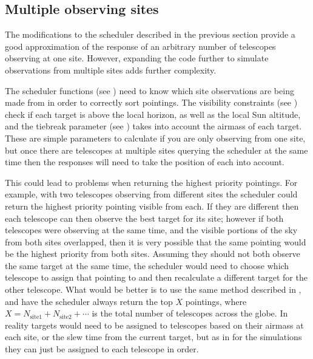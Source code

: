 \subsection{Multiple observing sites}
\label{sec:multi_site_scheduling}
\begin{colsection}

The modifications to the scheduler described in the previous section provide a good approximation of the response of an arbitrary number of telescopes observing at one site. However, expanding the code further to simulate observations from multiple sites adds further complexity.

The scheduler functions (see ) need to know which site observations are being made from in order to correctly sort pointings. The visibility constraints (see ) check if each target is above the local horizon, as well as the local Sun altitude, and the tiebreak parameter (see ) takes into account the airmass of each target. These are simple parameters to calculate if you are only observing from one site, but once there are telescopes at multiple sites querying the scheduler at the same time then the responses will need to take the position of each into account.

This could lead to problems when returning the highest priority pointings. For example, with two telescopes observing from different sites the scheduler could return the highest priority pointing visible from each. If they are different then each telescope can then observe the best target for its site; however if both telescopes were observing at the same time, and the visible portions of the sky from both sites overlapped, then it is very possible that the same pointing would be the highest priority from both sites. Assuming they should not both observe the same target at the same time, the scheduler would need to choose which telescope to assign that pointing to and then recalculate a different target for the other telescope. What would be better is to use the same method described in , and have the scheduler always return the top $X$ pointings, where $X = N_\text{site1} + N_\text{site2} + \cdots$ is the total number of telescopes across the globe. In reality targets would need to be assigned to telescopes based on their airmass at each site, or the slew time from the current target, but as in  for the simulations they can just be assigned to each telescope in order.


\end{colsection}
